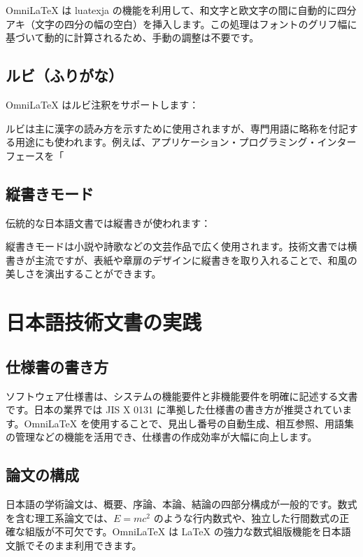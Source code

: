 \documentclass[
    language=japanese,
    doctype=article,
    institution=none,
]{../../omnilatex}
\begin{document}
OmniLaTeX は luatexja の機能を利用して、和文字と欧文字の間に自動的に四分アキ（文字の四分の幅の空白）を挿入します。この処理はフォントのグリフ幅に基づいて動的に計算されるため、手動の調整は不要です。

\subsection{ルビ（ふりがな）}
OmniLaTeX はルビ注釈をサポートします：


ルビは主に漢字の読み方を示すために使用されますが、専門用語に略称を付記する用途にも使われます。例えば、アプリケーション・プログラミング・インターフェースを「%

\subsection{縦書きモード}
伝統的な日本語文書では縦書きが使われます：


縦書きモードは小説や詩歌などの文芸作品で広く使用されます。技術文書では横書きが主流ですが、表紙や章扉のデザインに縦書きを取り入れることで、和風の美しさを演出することができます。

\section{日本語技術文書の実践}

\subsection{仕様書の書き方}
ソフトウェア仕様書は、システムの機能要件と非機能要件を明確に記述する文書です。日本の業界では JIS X 0131 に準拠した仕様書の書き方が推奨されています。OmniLaTeX を使用することで、見出し番号の自動生成、相互参照、用語集の管理などの機能を活用でき、仕様書の作成効率が大幅に向上します。

\subsection{論文の構成}
日本語の学術論文は、概要、序論、本論、結論の四部分構成が一般的です。数式を含む理工系論文では、$E = mc^2$ のような行内数式や、独立した行間数式の正確な組版が不可欠です。OmniLaTeX は \LaTeX{} の強力な数式組版機能を日本語文脈でそのまま利用できます。
\end{document}
